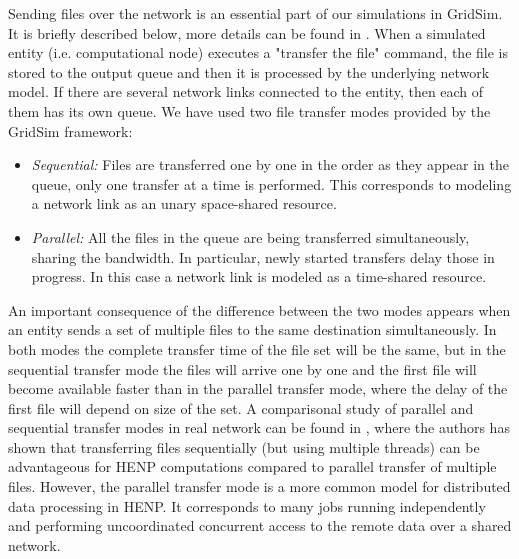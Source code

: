 \documentclass{svjour3}                     %
\begin{document}
Sending files over the network is an essential part of our simulations in GridSim. It is briefly described below, more details can be found in \cite{GridSimNetwork}. When a simulated entity (i.e. computational node) executes a "transfer the file" command, the file is stored to the output queue and then it is processed by the underlying network model. If there are several network links connected to the entity, then each of them has its own queue. We have used two file transfer modes provided by the GridSim framework:
\begin{itemize}
\item \textit{Sequential:} Files are transferred one by one in the order as they appear in the queue, only one transfer at a time is performed. This corresponds to modeling a network link as an unary space-shared resource.
\item \textit{Parallel:} All the files in the queue are being transferred simultaneously, sharing the bandwidth.  In particular, newly started transfers delay those in progress. In this case a network link is modeled as a time-shared resource.
\end{itemize}
An important consequence of the difference between the two modes appears when an entity sends a set of multiple files to the same destination simultaneously. In both modes the complete transfer time of the file set will be the same, but in the sequential transfer mode the files will arrive one by one and the first file will become available faster than in the parallel transfer mode, where the delay of the first file will depend on size of the set. A comparisonal study of parallel and sequential transfer modes in real network can be found in \cite{Zerola}, where the authors has shown that transferring files sequentially (but using multiple threads) can be advantageous for HENP computations compared to parallel transfer of multiple files. However, the parallel transfer mode is a more common model for distributed data processing in HENP. It corresponds to many jobs running independently and performing uncoordinated concurrent access to the remote data over a shared network.
\end{document}
